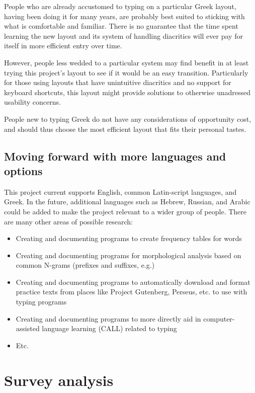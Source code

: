 \documentclass[11pt]{article}
\begin{document}
People who are already accustomed to typing on a particular Greek layout, having been doing it for many years, are probably best suited to sticking with what is comfortable and familiar. There is no guarantee that the time spent learning the new layout and its system of handling diacritics will ever pay for itself in more efficient entry over time.

However, people less wedded to a particular system may find benefit in at least trying this project's layout to see if it would be an easy transition. Particularly for those using layouts that have unintuitive diacritics and no support for keyboard shortcuts, this layout might provide solutions to otherwise unadressed usability concerns.

People new to typing Greek do not have any considerations of opportunity cost, and should thus choose the most efficient layout that fits their personal tastes.

\subsection{Moving forward with more languages and options}
\label{sec:org6ff2664}

This project current supports English, common Latin-script languages, and Greek. In the future, additional languages such as Hebrew, Russian, and Arabic could be added to make the project relevant to a wider group of people. There are many other areas of possible research:

\begin{itemize}
\item Creating and documenting programs to create frequency tables for words
\item Creating and documenting programs for morphological analysis based on common N-grams (prefixes and suffixes, e.g.)
\item Creating and documenting programs to automatically download and format practice texts from places like Project Gutenberg, Perseus, etc. to use with typing programs
\item Creating and documenting programs to more directly aid in computer-assisted language learning (CALL) related to typing
\item Etc.
\end{itemize}

\section{Survey analysis}
\label{sec:orgb2defb8}
\end{document}
